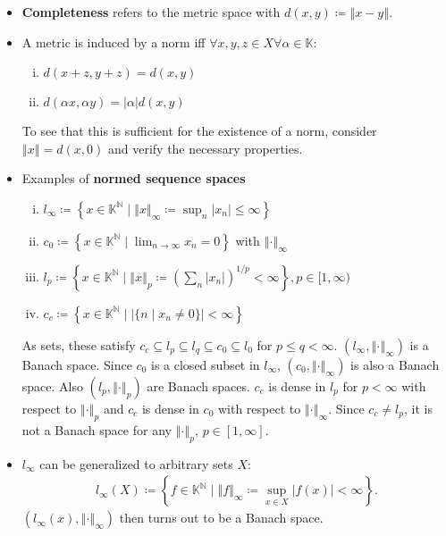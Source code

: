 \documentclass[10pt,a4paper]{article}
\theoremstyle{definition}
\theoremstyle{cor}
\theoremstyle{theorem}
\theoremstyle{lemma}
\theoremstyle{example}
\theoremstyle{remark}
\newcommand{\norm}[1]{\left\Vert #1 \right\Vert}
\begin{document}
\begin{itemize}
\item \textbf{Completeness} refers to the metric space with $d(x, y) \coloneqq \norm{x - y}$.
\item A metric is induced by a norm iff $\forall x,y,z \in X \forall\alpha\in\mathbb{K}:$
\begin{enumerate}[(i)]
\item $d(x+z, y+z) = d(x, y)$
\item $d(\alpha x, \alpha y) = |\alpha| d(x, y)$
\end{enumerate}
To see that this is sufficient for the existence of a norm, consider $\norm{x} = d(x , 0)$ and verify the necessary properties. 
\item Examples of \textbf{normed sequence spaces}
\begin{enumerate}[(i)]
\item $l_{\infty} \coloneqq \left\{ x \in \mathbb{K}^{\mathbb{N}} \mid \norm{x}_{\infty} \coloneqq \sup_{n} |x_n| \leq \infty \right\}$
\item $c_0 \coloneqq \left\{ x \in \mathbb{K}^{\mathbb{N}} \mid \lim_{n \rightarrow \infty} x_n = 0 \right\}$ with $\norm{\cdot}_{\infty}$
\item $l_{p} \coloneqq \left\{ x \in \mathbb{K}^{\mathbb{N}} \mid \norm{x}_p \coloneqq \left( \sum_n |x_n| \right)^{1/p} <\infty \right\}, p\in[1, \infty)$
\item $c_c \coloneqq \left\{ x \in \mathbb{K}^{\mathbb{N}} \mid \left| \{n \mid x_n \neq 0\}\right| < \infty \right\} $
\end{enumerate}
As sets, these satisfy $c_c \subseteq l_p \subseteq l_q \subseteq c_0 \subseteq l_0$ for $p \leq q < \infty$. $\left( l_{\infty}, \norm{\cdot}_{\infty} \right)$ is a Banach space. Since $c_0$ is a closed subset in $l_\infty$, $\left(c_0, \norm{\cdot}_{\infty}\right)$ is also a Banach space. Also $\left(l_p, \norm{\cdot}_{p}\right)$ are Banach spaces. $c_c$ is dense in $l_p$ for $p < \infty$ with respect to $\norm{\cdot}_p$ and $c_c$ is dense in $c_0$ with respect to $\norm{\cdot}_{\infty}$. Since $c_c \neq l_p$, it is not a Banach space for any $\norm{\cdot}_p$, $p\in[1, \infty]$.
\item $l_\infty$ can be generalized to arbitrary sets $X$: 
\begin{align*}
l_\infty(X) \coloneqq \left\{ f \in \mathbb{K}^{\mathbb{N}} \mid \norm{f}_\infty \coloneqq \sup_{x \in X} |f(x)| < \infty\right\}.
\end{align*}
$\left(l_\infty(x), \norm{\cdot}_\infty\right)$  then turns out to be a Banach space.

\end{itemize}
\end{document}
